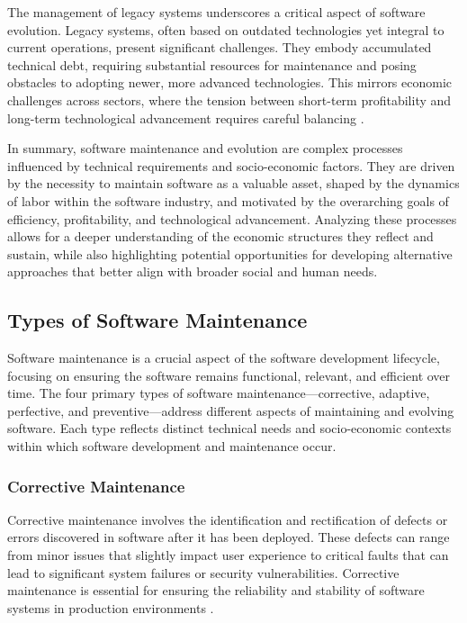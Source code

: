\begin{refsection}
The management of legacy systems underscores a critical aspect of software evolution. Legacy systems, often based on outdated technologies yet integral to current operations, present significant challenges. They embody accumulated technical debt, requiring substantial resources for maintenance and posing obstacles to adopting newer, more advanced technologies. This mirrors economic challenges across sectors, where the tension between short-term profitability and long-term technological advancement requires careful balancing \cite[pp.~279-287]{brooks1995mythical}.

In summary, software maintenance and evolution are complex processes influenced by technical requirements and socio-economic factors. They are driven by the necessity to maintain software as a valuable asset, shaped by the dynamics of labor within the software industry, and motivated by the overarching goals of efficiency, profitability, and technological advancement. Analyzing these processes allows for a deeper understanding of the economic structures they reflect and sustain, while also highlighting potential opportunities for developing alternative approaches that better align with broader social and human needs.

\subsection{Types of Software Maintenance}

Software maintenance is a crucial aspect of the software development lifecycle, focusing on ensuring the software remains functional, relevant, and efficient over time. The four primary types of software maintenance—corrective, adaptive, perfective, and preventive—address different aspects of maintaining and evolving software. Each type reflects distinct technical needs and socio-economic contexts within which software development and maintenance occur.

\subsubsection{Corrective Maintenance}

Corrective maintenance involves the identification and rectification of defects or errors discovered in software after it has been deployed. These defects can range from minor issues that slightly impact user experience to critical faults that can lead to significant system failures or security vulnerabilities. Corrective maintenance is essential for ensuring the reliability and stability of software systems in production environments \cite[pp.~53-54]{glass2003facts}.


\end{refsection}
